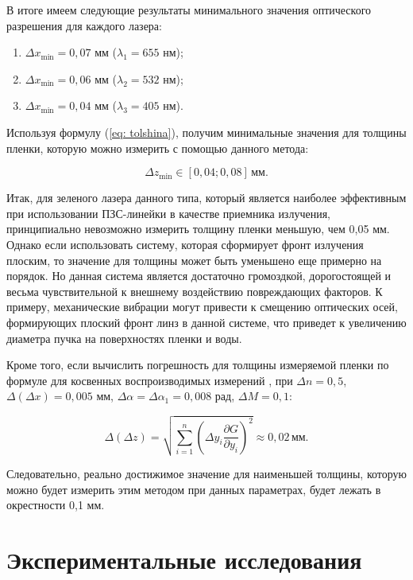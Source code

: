 В итоге имеем следующие результаты минимального значения оптического разрешения для каждого лазера:

\begin{enumerate}
\item $\Delta x_{\text{min}}=0,07$ мм ($\lambda_1=655$ нм);
\item $\Delta x_{\text{min}}=0,06$ мм ($\lambda_2=532$ нм);
\item $\Delta x_{\text{min}}=0,04$ мм ($\lambda_3=405$ нм).
\end{enumerate}


Используя формулу (\ref{eq: tolshina}), получим минимальные значения для толщины пленки, которую можно измерить с помощью данного метода:

\begin{equation}
\Delta z_{\text{min}} \in [0,04; 0,08] \, \text{мм}.
\end{equation}

Итак, для зеленого лазера данного типа, который является наиболее эффективным при использовании ПЗС-линейки в качестве приемника излучения, принципиально невозможно измерить толщину пленки меньшую, чем 0,05 мм. Однако если использовать систему, которая сформирует фронт излучения плоским, то значение для толщины может быть уменьшено еще примерно на порядок. Но данная система является достаточно громоздкой, дорогостоящей и весьма чувствительной к внешнему воздействию повреждающих факторов. К примеру, механические вибрации могут привести к смещению оптических осей, формирующих плоский фронт линз в данной системе, что приведет к увеличению диаметра пучка на поверхностях пленки и воды.


Кроме того, если вычислить погрешность для толщины измеряемой пленки по формуле для косвенных воспроизводимых измерений \cite{kassandrova}, при $\Delta n = 0,5$, $\Delta (\Delta x)=0,005$ мм, $\Delta \alpha=\Delta \alpha_1 = 0,008$ рад, $\Delta M=0,1$:

\begin{equation}
\Delta (\Delta z)=\sqrt{\sum_{i=1}^n \left(\Delta y_i \frac{\partial G}{\partial y_i}\right)^2} \approx 0,02 \, \text{мм}.
\end{equation}

Следовательно, реально достижимое значение для наименьшей толщины, которую можно будет измерить этим методом при данных параметрах, будет лежать в окрестности 0,1 мм.

\section{Экспериментальные исследования}

